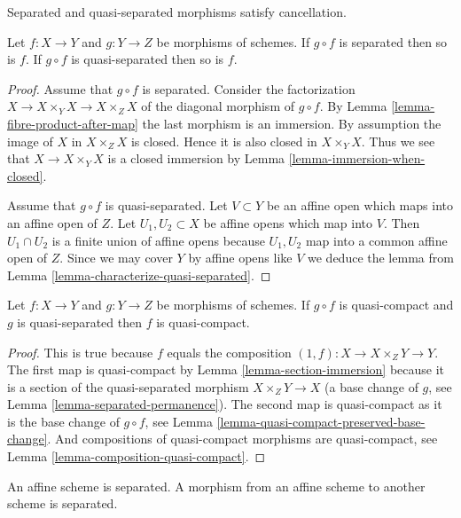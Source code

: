 \begin{lemma}
\label{lemma-compose-after-separated}
\begin{slogan}
Separated and quasi-separated morphisms satisfy cancellation.
\end{slogan}
Let $f : X \to Y$ and $g : Y \to Z$ be morphisms of schemes.
If $g \circ f$ is separated then so is $f$.
If $g \circ f$ is quasi-separated then so is $f$.
\end{lemma}

\begin{proof}
Assume that $g \circ f$ is separated.
Consider the factorization $X \to X \times_Y X \to X \times_Z X$
of the diagonal morphism of $g \circ f$.
By Lemma \ref{lemma-fibre-product-after-map}
the last morphism is an immersion. By assumption the image
of $X$ in $X \times_Z X$ is closed. Hence it is also closed
in $X \times_Y X$. Thus we see that $X \to X \times_Y X$
is a closed immersion by Lemma \ref{lemma-immersion-when-closed}.

\medskip\noindent
Assume that $g \circ f$ is quasi-separated.
Let $V \subset Y$ be an affine open which maps into an affine
open of $Z$. Let $U_1, U_2 \subset X$ be affine opens which
map into $V$. Then $U_1 \cap U_2$ is a finite union of affine
opens because $U_1, U_2$ map into a common affine open
of $Z$. Since we may cover $Y$ by affine opens like $V$ we
deduce the lemma from Lemma \ref{lemma-characterize-quasi-separated}.
\end{proof}

\begin{lemma}
\label{lemma-quasi-compact-permanence}
Let $f : X \to Y$ and $g : Y \to Z$ be morphisms of schemes.
If $g \circ f$ is quasi-compact and $g$ is quasi-separated
then $f$ is quasi-compact.
\end{lemma}

\begin{proof}
This is true because $f$ equals the composition
$(1, f) : X \to X \times_Z Y \to Y$. The first map
is quasi-compact by Lemma \ref{lemma-section-immersion}
because it is a section of the quasi-separated morphism $X \times_Z Y \to X$
(a base change of $g$, see Lemma \ref{lemma-separated-permanence}).
The second map is quasi-compact as it
is the base change of $g \circ f$, see
Lemma \ref{lemma-quasi-compact-preserved-base-change}.
And compositions of quasi-compact
morphisms are quasi-compact, see Lemma \ref{lemma-composition-quasi-compact}.
\end{proof}

\begin{lemma}
\label{lemma-affine-separated}
An affine scheme is separated. A morphism from an affine scheme
to another scheme is separated.
\end{lemma}

